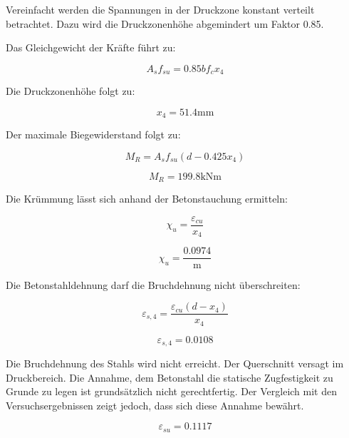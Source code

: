 \documentclass[
  letterpaper,
]{scrreprt}
\begin{document}
Vereinfacht werden die Spannungen in der Druckzone konstant verteilt
betrachtet. Dazu wird die Druckzonenhöhe abgemindert um Faktor 0.85.

Das Gleichgewicht der Kräfte führt zu:

\begin{equation}A_{s} f_{su} = 0.85 b f_{c} x_{4}\end{equation}

Die Druckzonenhöhe folgt zu:

\begin{equation}x_{4} = 51.4 \text{mm}\end{equation}

Der maximale Biegewiderstand folgt zu:

\begin{equation}M_{R} = A_{s} f_{su} \left(d - 0.425 x_{4}\right)\end{equation}

\begin{equation}M_{R} = 199.8 \text{kN} \text{m}\end{equation}

Die Krümmung lässt sich anhand der Betonstauchung ermitteln:

\begin{equation}\chi_{u} = \frac{\varepsilon_{cu}}{x_{4}}\end{equation}

\begin{equation}\chi_{u} = \frac{0.0974}{\text{m}}\end{equation}

Die Betonstahldehnung darf die Bruchdehnung nicht überschreiten:

\begin{equation}\varepsilon_{s,4} = \frac{\varepsilon_{cu} \left(d - x_{4}\right)}{x_{4}}\end{equation}

\begin{equation}\varepsilon_{s,4} = 0.0108\end{equation}

Die Bruchdehnung des Stahls wird nicht erreicht. Der Querschnitt versagt
im Druckbereich. Die Annahme, dem Betonstahl die statische Zugfestigkeit
zu Grunde zu legen ist grundsätzlich nicht gerechtfertig. Der Vergleich
mit den Versuchsergebnissen zeigt jedoch, dass sich diese Annahme
bewährt.

\begin{equation}\varepsilon_{su} = 0.1117\end{equation}
\end{document}
